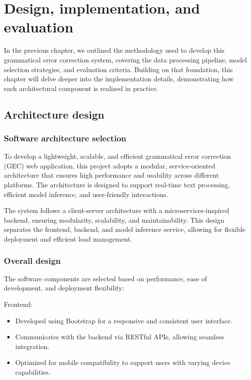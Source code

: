 \chapter{Design, implementation, and evaluation}
\label{chapter:design}

In the previous chapter, we outlined the methodology used to develop this grammatical error correction system, covering the data processing pipeline, model selection strategies, and evaluation criteria.
Building on that foundation, this chapter will delve deeper into the implementation details, demonstrating how each architectural component is realized in practice.

\section{Architecture design}

\subsection{Software architecture selection}

To develop a lightweight, scalable, and efficient grammatical error correction (GEC) web application, this project adopts a modular, service-oriented architecture that ensures high performance and usability across different platforms.
The architecture is designed to support real-time text processing, efficient model inference, and user-friendly interactions.

The system follows a client-server architecture with a microservices-inspired backend, ensuring modularity, scalability, and maintainability.
This design separates the frontend, backend, and model inference service, allowing for flexible deployment and efficient load management.

\subsection{Overall design}

The software components are selected based on performance, ease of development, and deployment flexibility:

Frontend:

\begin{itemize}
  \item Developed using Bootstrap for a responsive and consistent user interface.
  \item Communicates with the backend via RESTful APIs, allowing seamless integration.
  \item Optimized for mobile compatibility to support users with varying device capabilities.
\end{itemize}

